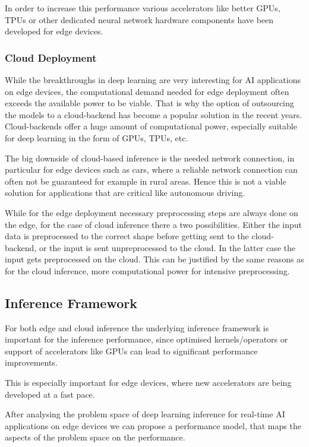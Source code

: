In order to increase this performance various accelerators like better GPUs, TPUs or other dedicated neural network hardware components have been developed for edge devices.

\subsubsection{Cloud Deployment}
While the breakthroughs in deep learning are very interesting for AI applications on edge devices, the computational demand needed for edge deployment often exceeds the available power to be viable.
That is why the option of outsourcing the models to a cloud-backend has become a popular solution in the recent years.
Cloud-backends offer a huge amount of computational power, especially suitable for deep learning in the form of GPUs, TPUs, etc.


The big downside of cloud-based inference is the needed network connection, in particular for edge devices such as cars, where a reliable network connection can often not be guaranteed for example in rural areas. Hence this is not a viable solution for applications that are critical like autonomous driving.

While for the edge deployment necessary preprocessing steps are always done on the edge, for the case of cloud inference there a two possibilities. Either the input data is preprocessed to the correct shape before getting sent to the cloud-backend, or the input is sent unpreprocessed to the cloud. 
In the latter case the input gets preprocessed on the cloud. 
This can be justified by the same reasons as for the cloud inference, more computational power for intensive preprocessing.
\subsection{Inference Framework}
For both edge and cloud inference the underlying inference framework is important for the inference performance, since optimised kernels/operators or support of accelerators like GPUs can lead to significant performance improvements.

This is especially important for edge devices, where new accelerators are being developed at a fast pace.


After analysing the problem space of deep learning inference for real-time AI applications on edge devices we can propose a performance model, that maps the aspects of the problem space on the performance.



